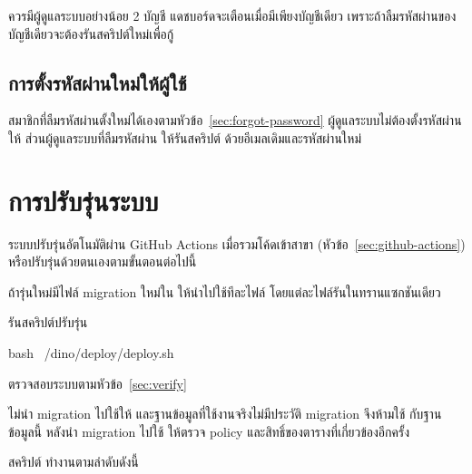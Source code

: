 \begin{tip}
ควรมีผู้ดูแลระบบอย่างน้อย 2 บัญชี แดชบอร์ดจะเตือนเมื่อมีเพียงบัญชีเดียว เพราะถ้าลืมรหัสผ่านของบัญชีเดียวจะต้องรันสคริปต์ใหม่เพื่อกู้
\end{tip}

\subsection{การตั้งรหัสผ่านใหม่ให้ผู้ใช้}

สมาชิกที่ลืมรหัสผ่านตั้งใหม่ได้เองตามหัวข้อ~\ref{sec:forgot-password} ผู้ดูแลระบบไม่ต้องตั้งรหัสผ่านให้ ส่วนผู้ดูแลระบบที่ลืมรหัสผ่าน ให้รันสคริปต์  ด้วยอีเมลเดิมและรหัสผ่านใหม่

\section{การปรับรุ่นระบบ}
\label{sec:upgrade}

ระบบปรับรุ่นอัตโนมัติผ่าน GitHub Actions เมื่อรวมโค้ดเข้าสาขา  (หัวข้อ~\ref{sec:github-actions}) หรือปรับรุ่นด้วยตนเองตามขั้นตอนต่อไปนี้

\begin{steps}
  \item ถ้ารุ่นใหม่มีไฟล์ migration ใหม่ใน  ให้นำไปใช้ทีละไฟล์ โดยแต่ละไฟล์รันในทรานแซกชันเดียว
  \item รันสคริปต์ปรับรุ่น
\begin{terminal}
bash ~/dino/deploy/deploy.sh
\end{terminal}
  \item ตรวจสอบระบบตามหัวข้อ~\ref{sec:verify}
\end{steps}

\begin{important}
 ไม่นำ migration ไปใช้ให้ และฐานข้อมูลที่ใช้งานจริงไม่มีประวัติ migration จึงห้ามใช้  กับฐานข้อมูลนี้ หลังนำ migration ไปใช้ ให้ตรวจ policy และสิทธิ์ของตารางที่เกี่ยวข้องอีกครั้ง
\end{important}

สคริปต์  ทำงานตามลำดับดังนี้

